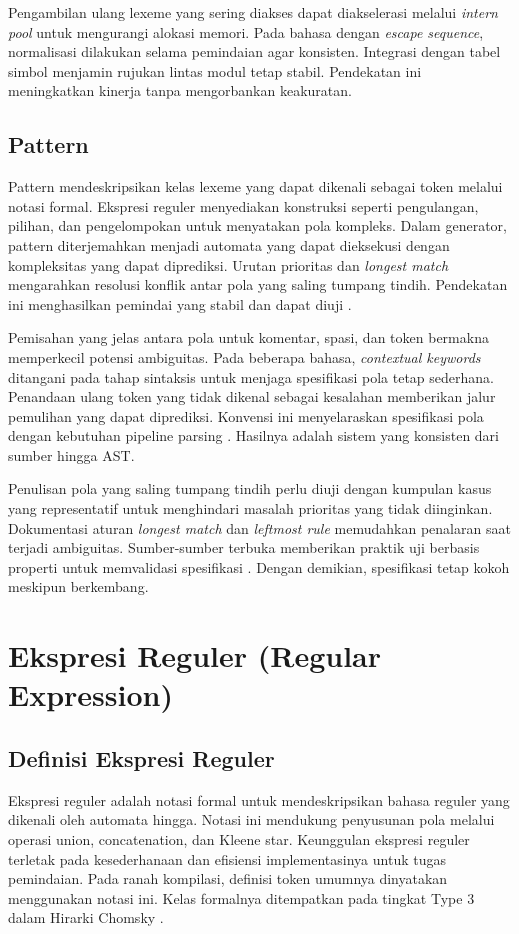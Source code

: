 \documentclass[../main.tex]{subfiles}
\begin{document}
Pengambilan ulang lexeme yang sering diakses dapat diakselerasi melalui \emph{intern pool} untuk mengurangi alokasi memori. Pada bahasa dengan \emph{escape sequence}, normalisasi dilakukan selama pemindaian agar konsisten. Integrasi dengan tabel simbol menjamin rujukan lintas modul tetap stabil. Pendekatan ini meningkatkan kinerja tanpa mengorbankan keakuratan.

\subsection{Pattern}
Pattern mendeskripsikan kelas lexeme yang dapat dikenali sebagai token melalui notasi formal. Ekspresi reguler menyediakan konstruksi seperti pengulangan, pilihan, dan pengelompokan untuk menyatakan pola kompleks. Dalam generator, pattern diterjemahkan menjadi automata yang dapat dieksekusi dengan kompleksitas yang dapat diprediksi. Urutan prioritas dan \emph{longest match} mengarahkan resolusi konflik antar pola yang saling tumpang tindih. Pendekatan ini menghasilkan pemindai yang stabil dan dapat diuji \citep{WikiRegex}.

Pemisahan yang jelas antara pola untuk komentar, spasi, dan token bermakna memperkecil potensi ambiguitas. Pada beberapa bahasa, \emph{contextual keywords} ditangani pada tahap sintaksis untuk menjaga spesifikasi pola tetap sederhana. Penandaan ulang token yang tidak dikenal sebagai kesalahan memberikan jalur pemulihan yang dapat diprediksi. Konvensi ini menyelaraskan spesifikasi pola dengan kebutuhan pipeline parsing \citep{FlexManual}. Hasilnya adalah sistem yang konsisten dari sumber hingga AST.

Penulisan pola yang saling tumpang tindih perlu diuji dengan kumpulan kasus yang representatif untuk menghindari masalah prioritas yang tidak diinginkan. Dokumentasi aturan \emph{longest match} dan \emph{leftmost rule} memudahkan penalaran saat terjadi ambiguitas. Sumber-sumber terbuka memberikan praktik uji berbasis properti untuk memvalidasi spesifikasi \citep{FlexManual}. Dengan demikian, spesifikasi tetap kokoh meskipun berkembang.

\section{Ekspresi Reguler (Regular Expression)}
\subsection{Definisi Ekspresi Reguler}
Ekspresi reguler adalah notasi formal untuk mendeskripsikan bahasa reguler yang dikenali oleh automata hingga. Notasi ini mendukung penyusunan pola melalui operasi union, concatenation, dan Kleene star. Keunggulan ekspresi reguler terletak pada kesederhanaan dan efisiensi implementasinya untuk tugas pemindaian. Pada ranah kompilasi, definisi token umumnya dinyatakan menggunakan notasi ini. Kelas formalnya ditempatkan pada tingkat Type 3 dalam Hirarki Chomsky \citep{WikiRegex,WikiChomsky}.
\end{document}
